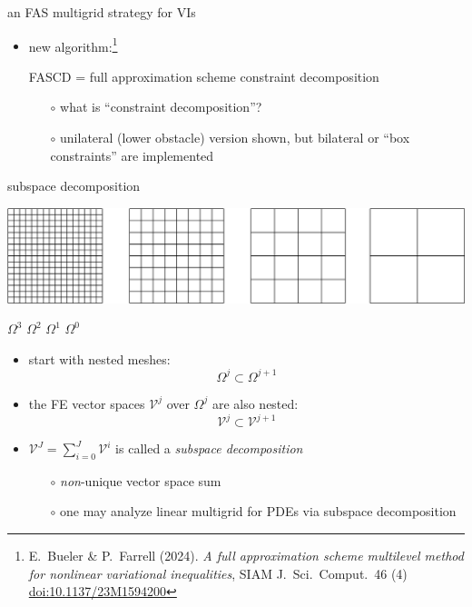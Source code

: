 \documentclass[svgnames,
               hyperref={colorlinks,citecolor=DeepPink4,linkcolor=FireBrick,urlcolor=Maroon},
               usepdftitle=false]  %
               {beamer}
\newcommand{\sdoi}[1]{\,{\tiny \href{https://doi.org/#1}{doi:#1}}}
\begin{document}
\begin{frame}{an FAS multigrid strategy for VIs}

\begin{itemize}
\item new algorithm:\footnote{E.~Bueler \& P.~Farrell (2024). \emph{A full approximation scheme multilevel method for nonlinear variational inequalities}, SIAM J.~Sci.~Comput.~46 (4) \sdoi{10.1137/23M1594200}}

\bigskip
{\color{FireBrick} FASCD = full approximation scheme constraint decomposition}

\bigskip
    \begin{itemize}
    \item[$\circ$] what is ``constraint decomposition''?
    \item[$\circ$] unilateral (lower obstacle) version shown, but bilateral or ``box constraints'' are implemented
    \end{itemize}
\end{itemize}
\end{frame}


\begin{frame}{subspace decomposition}

\hfill \includegraphics[height=0.12\textheight]{../talk-oxford/images/mg-grids.png}

{\footnotesize
\hfill $\Omega^3$ \hspace{8.5mm} $\Omega^2$ \hspace{8.5mm} $\Omega^1$ \hspace{8.5mm} $\Omega^0$ \hspace{1mm}
}

\begin{itemize}
\item start with nested meshes:
    $$\Omega^j \subset \Omega^{j+1}$$
\item the FE vector spaces $\mathcal{V}^j$ over $\Omega^j$ are also nested:
    $$\mathcal{V}^j \subset \mathcal{V}^{j+1}$$
\item $\mathcal{V}^J = \sum_{i=0}^J \mathcal{V}^i$ is called a \emph{subspace decomposition}

    \begin{itemize}
    \item[$\circ$] \emph{non}-unique vector space sum
    \item[$\circ$] one may analyze linear multigrid for PDEs via subspace decomposition
    \end{itemize}
\end{itemize}
\end{frame}
\end{document}
